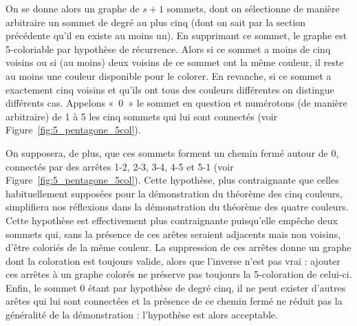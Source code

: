 \documentclass[french]{report}
\begin{document}
On se donne alors un graphe de $s+1$ sommets, dont on sélectionne de manière arbitraire un sommet de degré au plus cinq (dont on sait par la section précédente qu'il en existe au moins un). En supprimant ce sommet, le graphe est 5-coloriable par hypothèse de récurrence. Alors si ce sommet a moins de cinq voisins ou si (au moins) deux voisins de ce sommet ont la même couleur, il reste au moins une couleur disponible pour le colorer. En revanche, si ce sommet a exactement cinq voisins et qu'ils ont tous des couleurs différentes on distingue différents cas. Appelons «~0~» le sommet en question et numérotons (de manière arbitraire) de 1 à 5 les cinq sommets qui lui sont connectés (voir Figure~\ref{fig:5_pentagone_5col}).

%	

On supposera, de plus, que ces sommets forment un chemin fermé autour de 0, connectés par des arrêtes 1-2, 2-3, 3-4, 4-5 et 5-1 (voir Figure~\ref{fig:5_pentagone_5col}). Cette hypothèse, plus contraignante que celles habituellement supposées pour la démonstration du théorème des cinq couleurs, simplifiera nos réflexions dans la démonstration du théorème des quatre couleurs. Cette hypothèse est effectivement plus contraignante puisqu'elle empêche deux sommets qui, sans la présence de ces arêtes seraient adjacents mais non voisins, d'être coloriés de la même couleur. La suppression de ces arrêtes donne un graphe dont la coloration est toujours valide, alors que l'inverse n'est pas vrai : ajouter ces arrêtes à un graphe colorés ne préserve pas toujours la 5-coloration de celui-ci. Enfin, le sommet 0 étant par hypothèse de degré cinq, il ne peut exister d'autres arêtes qui lui sont connectées et la présence de ce chemin fermé ne réduit pas la généralité de la démonstration : l'hypothèse est alors acceptable.

\end{document}
